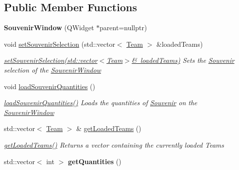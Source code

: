 \subsection*{Public Member Functions}
\begin{DoxyCompactItemize}
\item 
\mbox{\label{class_souvenir_window_af2665f6d0cceb868136cebb928536aa1}} 
{\bfseries Souvenir\+Window} (Q\+Widget $\ast$parent=nullptr)
\item 
void \mbox{\hyperlink{class_souvenir_window_a1ded9a4ba9dd58b0f6dad72917b558b2}{set\+Souvenir\+Selection}} (std\+::vector$<$ \mbox{\hyperlink{class_team}{Team}} $>$ \&loaded\+Teams)
\begin{DoxyCompactList}\small\item\em \mbox{\hyperlink{class_souvenir_window_a1ded9a4ba9dd58b0f6dad72917b558b2}{set\+Souvenir\+Selection(std\+::vector$<$\+Team$>$\& loaded\+Teams)}} Sets the \mbox{\hyperlink{class_souvenir}{Souvenir}} selection of the \mbox{\hyperlink{class_souvenir_window}{Souvenir\+Window}} \end{DoxyCompactList}\item 
void \mbox{\hyperlink{class_souvenir_window_a1c004a0549aeb3b18269f1330c23168e}{load\+Souvenir\+Quantities}} ()
\begin{DoxyCompactList}\small\item\em \mbox{\hyperlink{class_souvenir_window_a1c004a0549aeb3b18269f1330c23168e}{load\+Souvenir\+Quantities()}} Loads the quantities of \mbox{\hyperlink{class_souvenir}{Souvenir}} on the \mbox{\hyperlink{class_souvenir_window}{Souvenir\+Window}} \end{DoxyCompactList}\item 
std\+::vector$<$ \mbox{\hyperlink{class_team}{Team}} $>$ \& \mbox{\hyperlink{class_souvenir_window_a7986e93d5b36524ff45b4218baa26abe}{get\+Loaded\+Teams}} ()
\begin{DoxyCompactList}\small\item\em \mbox{\hyperlink{class_souvenir_window_a7986e93d5b36524ff45b4218baa26abe}{get\+Loaded\+Teams()}} Returns a vector containing the currently loaded Teams \end{DoxyCompactList}\item 
\mbox{\label{class_souvenir_window_a0261810aa9a58cd4609d81e96c1d4902}} 
std\+::vector$<$ int $>$ {\bfseries get\+Quantities} ()
\end{DoxyCompactItemize}


